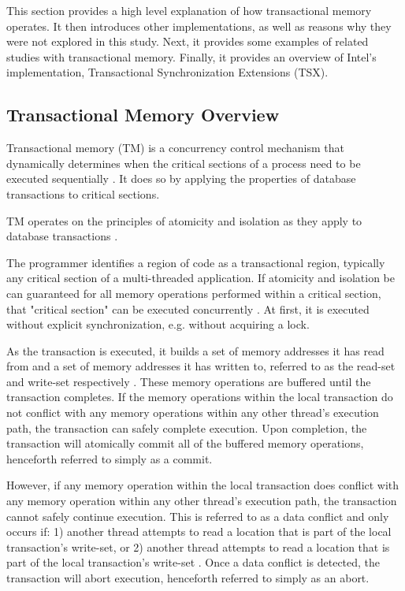 \documentclass[a4paper]{article}
\begin{document}
\indent This section provides a high level explanation of how transactional
memory operates.  It then introduces other implementations, as well as reasons
why they were not explored in this study.  Next, it provides some examples of related
studies with transactional memory. Finally, it provides an overview of Intel's
implementation, Transactional Synchronization Extensions (TSX).

\subsection{\textbf{Transactional Memory Overview}}

\indent Transactional memory (TM) is a concurrency control mechanism that
dynamically determines when the critical sections of a process need to be executed
sequentially \cite{sle_rajwar}.  It does so by applying the properties of
database transactions to critical sections.  

TM operates on the principles of atomicity and
isolation as they apply to database transactions \cite{tm_2nd}.  

\indent The programmer identifies a region of code as a transactional region, typically
any critical section of a multi-threaded application.  If atomicity and
isolation be can guaranteed for all memory operations performed within a
critical section, that "critical section" can be executed concurrently
\cite{sle_rajwar}.  At first, it is executed without explicit synchronization,
e.g. without acquiring a lock.\par

\indent As the transaction is executed, it builds a set of memory addresses it
has read from and a set of memory addresses it has written to, referred to as
the read-set and write-set respectively \cite{intel_prog_ref}.  These memory
operations are buffered until the transaction completes.  If the  memory
operations within the local transaction do not conflict with any memory
operations within any other thread's execution path, the transaction can safely
complete execution.  Upon completion, the transaction will atomically commit all of
the buffered memory operations, henceforth referred to simply as a commit.\par

\indent However, if any memory operation within the local transaction does
conflict with any memory operation within any other thread's execution path, the
transaction cannot safely continue execution.  This is referred to as a data
conflict and only occurs if: 1) another thread attempts to read a location that
is part of the local transaction's write-set, or 2) another thread attempts to
read a location that is part of the local transaction's write-set
\cite{intel_prog_ref}.  Once a data conflict is detected, the transaction will
abort execution, henceforth referred to simply as an abort.\par
\end{document}
